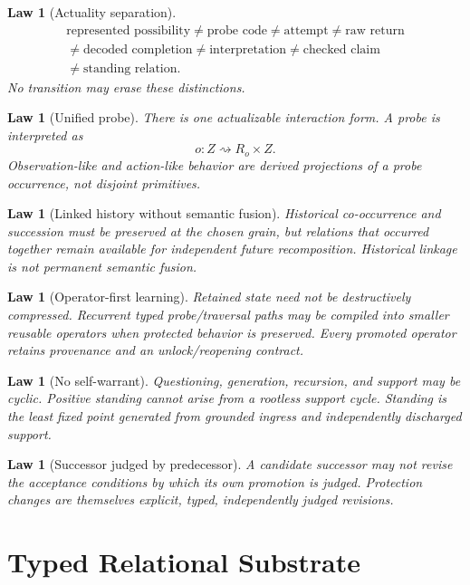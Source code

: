 \documentclass[11pt,oneside]{article}
\newtheorem{law}[definition]{Law}
\begin{document}
\begin{law}[Actuality separation]
\[
\boxed{
\begin{gathered}
\text{represented possibility}\neq\text{probe code}\neq\text{attempt}\neq\text{raw return}\\
{}\neq\text{decoded completion}\neq\text{interpretation}\neq\text{checked claim}\\
{}\neq\text{standing relation}.
\end{gathered}
}
\]
No transition may erase these distinctions.
\end{law}

\begin{law}[Unified probe]
There is one actualizable interaction form.  A probe is interpreted as
\[
o:Z\rightsquigarrow R_o\times Z .
\]
Observation-like and action-like behavior are derived projections of a probe occurrence, not disjoint primitives.
\end{law}

\begin{law}[Linked history without semantic fusion]
Historical co-occurrence and succession must be preserved at the chosen grain, but relations that occurred together remain available for independent future recomposition.  Historical linkage is not permanent semantic fusion.
\end{law}

\begin{law}[Operator-first learning]
Retained state need not be destructively compressed.  Recurrent typed probe/traversal paths may be compiled into smaller reusable operators when protected behavior is preserved.  Every promoted operator retains provenance and an unlock/reopening contract.
\end{law}

\begin{law}[No self-warrant]
Questioning, generation, recursion, and support may be cyclic.  Positive standing cannot arise from a rootless support cycle.  Standing is the least fixed point generated from grounded ingress and independently discharged support.
\end{law}

\begin{law}[Successor judged by predecessor]
A candidate successor may not revise the acceptance conditions by which its own promotion is judged.  Protection changes are themselves explicit, typed, independently judged revisions.
\end{law}

\part{Typed Relational Substrate}
\end{document}
